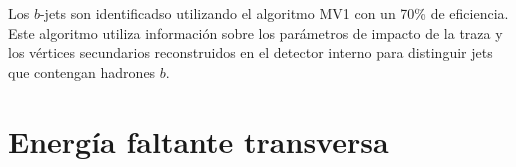 
Los $b$-jets son identificadso utilizando el algoritmo MV1\cite{btagging} con un
70\% de eficiencia. %
Este algoritmo utiliza información sobre los parámetros de impacto de la traza y los
vértices secundarios reconstruidos en el detector interno para distinguir jets
que contengan hadrones $b$.




\section{Energía faltante transversa}
\label{sec:met_obj}



